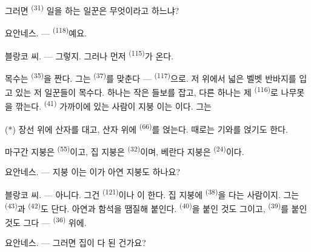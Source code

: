 그러면  \textsuperscript{(31)} 일을 하는 일꾼은 무엇이라고 하느냐?

\textsc{요안네스}. ---  \textsuperscript{(118)}예요.

\VUsaut{3.0mm}
\VUsaut{3.0mm}

\textsc{블랑코} 씨. --- 그렇지. 그러나 먼저  \textsuperscript{(115)}가 온다.

목수는  \textsuperscript{(35)}을 짠다. 그는 
\textsuperscript{(37)}를 맞춘다 —  \textsuperscript{(117)}으로. 저 위에서
넓은 벨벳 반바지를 입고 있는 저 일꾼들이 목수다. 하나는 작은 들보를 잡고, 다른 하나는
제  \textsuperscript{(116)}로 나무못을 깎는다. 
\textsuperscript{(41)} 가까이에 있는 사람이 지붕 이는 이다. 그는


(*) 장선 위에 산자를 대고, 산자 위에  \textsuperscript{(66)}를 얹는다.
때로는 기와를 얹기도 한다.

마구간 지붕은  \textsuperscript{(55)}이고, 집 지붕은
 \textsuperscript{(32)}이며, 베란다 지붕은 
\textsuperscript{(24)}이다.

\textsc{요안네스}. --- 지붕 이는 이가 아연 지붕도 하나요?

\textsc{블랑코} 씨. --- 아니다. 그건  \textsuperscript{(121)}이나
이 한다. 집 지붕에  \textsuperscript{(38)}을 다는 사람이지.
그는  \textsuperscript{(43)}과 
\textsuperscript{(42)}도 단다. 아연과 함석을 땜질해 붙인다. 
\textsuperscript{(40)}을 붙인 것도 그이고,  \textsuperscript{(39)}를
붙인 것도 그다 —  \textsuperscript{(36)} 위에.

\textsc{요안네스}. --- 그러면 집이 다 된 건가요?

